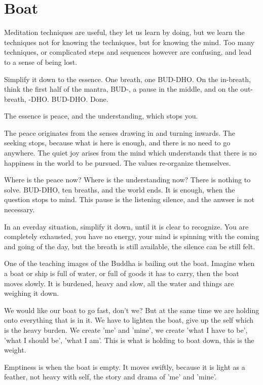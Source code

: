 \hypertarget{boat-1}{%
\chapter{Boat}\label{boat-1}}

Meditation techniques are useful, they let us learn by doing, but we
learn the techniques not for knowing the techniques, but for knowing the
mind. Too many techniques, or complicated steps and sequences however
are confusing, and lead to a sense of being lost.

Simplify it down to the essence. One breath, one BUD-DHO. On the
in-breath, think the first half of the mantra, BUD-, a pause in the
middle, and on the out-breath, -DHO. BUD-DHO. Done.

The essence is peace, and the understanding, which stops you.

The peace originates from the senses drawing in and turning inwards. The
seeking stops, because what is here is enough, and there is no need to
go anywhere. The quiet joy arises from the mind which understands that
there is no happiness in the world to be pursued. The values re-organize
themselves.

Where is the peace now? Where is the understanding now? There is nothing
to solve. BUD-DHO, ten breaths, and the world ends. It is enough, when
the question stops to mind. This pause is the listening silence, and the
anwser is not necessary.

In an everday situation, simplify it down, until it is clear to
recognize. You are completely exhausted, you have no energy, your mind
is spinning with the coming and going of the day, but the breath is
still available, the silence can be still felt.

One of the teaching images of the Buddha is bailing out the boat.
Imagine when a boat or ship is full of water, or full of goods it has to
carry, then the boat moves slowly. It is burdened, heavy and slow, all
the water and things are weighing it down.

We would like our boat to go fast, don't we? But at the same time we are
holding onto everything that is in it. We have to lighten the boat, give
up the self which is the heavy burden. We create 'me' and 'mine', we
create 'what I have to be', 'what I should be', 'what I am'. This is
what is holding to boat down, this is the weight.

Emptiness is when the boat is empty. It moves swiftly, because it is
light as a feather, not heavy with self, the story and drama of 'me' and
'mine'.

